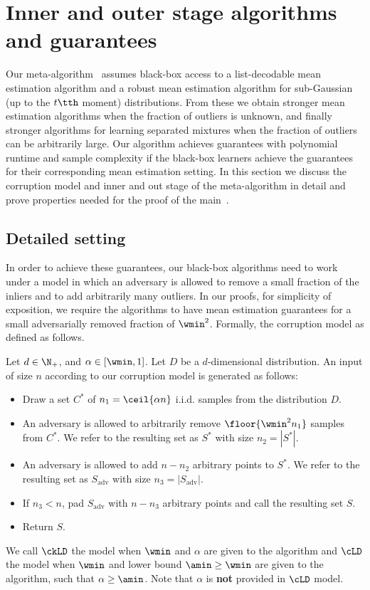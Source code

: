 \section{Inner and outer stage algorithms and guarantees}

Our meta-algorithm~ assumes black-box access to a list-decodable mean estimation algorithm and a robust mean estimation algorithm for sub-Gaussian (up to the $t\tth$ moment) distributions.
From these we obtain stronger mean estimation algorithms when the fraction of outliers is unknown, and finally stronger algorithms for learning separated mixtures when the fraction of outliers can be arbitrarily large.
Our algorithm achieves guarantees with polynomial runtime and sample complexity if the black-box learners achieve the guarantees for their corresponding mean estimation setting. In this section we discuss the corruption model and inner and out stage of the meta-algorithm in detail and prove properties needed for the proof of the main~.
\subsection{Detailed setting}

In order to achieve these guarantees, our black-box algorithms need to work
under a model in which an adversary is allowed to remove a small fraction of the inliers and to add arbitrarily many outliers.
In our proofs, for simplicity of exposition, we require the algorithms to have mean estimation guarantees for a small adversarially removed fraction of $\wmin^2$. Formally, the corruption model as defined as follows.

\begin{definition}
\label{def:cor-model}
Let $d \in \N_+$, and $\alpha \in [\wmin, 1]$. 
Let $D$ be a $d$-dimensional distribution.
An input of size $n$ according to our corruption model is generated as follows:
\begin{itemize}
    \item 
    Draw a set  $C^*$ of $n_1= \ceil{\alpha n}$ i.i.d. samples from the distribution $D$.
    \item An adversary is allowed to arbitrarily remove
    $\floor{\wmin^2n_1}$ samples from $C^*$. We refer to the resulting set as $S^*$ with size $n_2 = |S^*|$.
    \item An adversary is allowed to add $n-n_2$ arbitrary points to $S^*$. We refer to the resulting set as $S_{\textrm{adv}}$ with size  $n_3 = |S_{\textrm{adv}}|$.%
    \item If $n_3 < n$, pad $S_{\textrm{adv}}$ with $n-n_3$ arbitrary points and call the resulting set $S$.
    \item Return $S$.
\end{itemize}
We call \(\ckLD\) the model when \(\wmin\) and \(\alpha\) are given to the algorithm and \(\cLD\) the model when \(\wmin\) and lower bound \(\amin \geq \wmin\) are given to the algorithm, such that \(\alpha \geq \amin\). Note that \(\alpha\) is \textbf{not} provided in \(\cLD\) model.
\end{definition}

